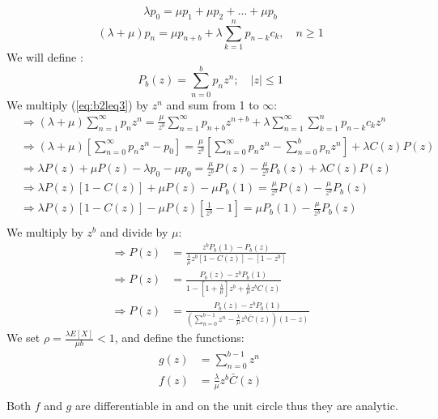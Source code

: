 \documentclass{article}
\begin{document}
\begin{equation}
\lambda p_0 = \mu p_1 + \mu p_2 + \dots + \mu p_b
\label{eq:bleq3}
\end{equation}
\begin{equation}
(\lambda + \mu)p_n = \mu p_{n+b} + \lambda \sum_{k=1}^{n} p_{n-k} c_k, \quad n \geq 1
\label{eq:b2leq3}
\end{equation}
We will define :
\begin{equation*}
P_b(z) = \sum_{n=0}^{b} p_n z^n; \quad |z| \leq 1
\end{equation*}
We multiply (\ref{eq:b2leq3}) by $z^n$ and sum from 1 to $\infty$:
\begin{align*}
&\Rightarrow(\lambda + \mu) \sum_{n=1}^{\infty} p_n z^n = \frac{\mu}{z^b} \sum_{n=1}^{\infty} p_{n+b} z^{n+b} + \lambda \sum_{n=1}^{\infty} \sum_{k=1}^{n} p_{n-k} c_k z^n\\
&\Rightarrow (\lambda+\mu)\left[\sum_{n=0}^{\infty} p_n z^n - p_0\right] = \frac{\mu}{z^b} \left[\sum_{n=0}^{\infty} p_n z^n - \sum_{n=0}^{b} p_n z^n\right] + \lambda C(z)P(z) \\
&\Rightarrow \lambda P(z) + \mu P(z) - \lambda p_0 - \mu p_0 = \frac{\mu}{z^b} P(z) - \frac{\mu}{z^b} P_b(z) + \lambda C(z)P(z) \\
&\Rightarrow \lambda P(z)[1-C(z)] + \mu P(z) - \mu P_b(1) = \frac{\mu}{z^b} P(z) - \frac{\mu}{z^b} P_b(z) \\
&\Rightarrow \lambda P(z)[1-C(z)] - \mu P(z)\left[\frac{1}{z^b} - 1\right] = \mu P_b(1) - \frac{\mu}{z^b} P_b(z) \\
\end{align*}
We multiply by $z^b$ and divide by $\mu$:
\begin{align*}
\Rightarrow P(z) &= \frac{z^b P_b(1)-P_b(z)}{\frac{\lambda}{\mu} z^b [1 - C(z)] - [1 - z^b]} \\
\Rightarrow P(z) &= \frac{P_b(z) - z^b P_b(1)}{1 -[1+\frac{\lambda}{\mu}] z^b +\frac{\lambda}{\mu} z^b C(z)}\\
\Rightarrow P(z) &= \frac{P_b(z) - z^b P_b(1)}{\left(\sum_{n=0}^{b-1} z^n - \frac{\lambda}{\mu} z^b \bar{C}(z) \right)(1-z)}
\end{align*}
We set $\rho = \frac{\lambda E[X]}{\mu b} < 1$, and define the functions:
\begin{align*}
g(z) &= \sum_{n=0}^{b-1} z^n \\
f(z) &= \frac{\lambda}{\mu} z^b \bar{C}(z) \\
\end{align*}
Both $f$ and $g$  are differentiable in and on the unit circle thus they are analytic.\\
\end{document}
